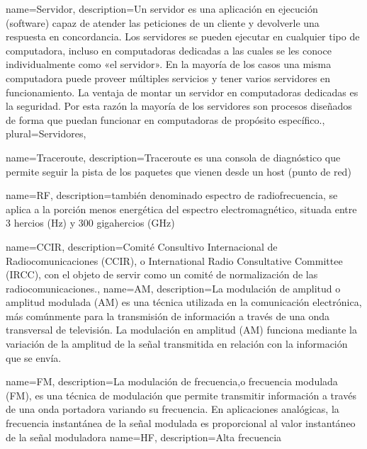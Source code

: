
{
name=Servidor,
description={Un servidor es una aplicación en ejecución (software) capaz de atender las peticiones de un cliente y devolverle una respuesta en concordancia. Los servidores se pueden ejecutar en cualquier tipo de computadora, incluso en computadoras dedicadas a las cuales se les conoce individualmente como «el servidor». En la mayoría de los casos una misma computadora puede proveer múltiples servicios y tener varios servidores en funcionamiento. La ventaja de montar un servidor en computadoras dedicadas es la seguridad. Por esta razón la mayoría de los servidores son procesos diseñados de forma que puedan funcionar en computadoras de propósito específico.},
plural={Servidores},
}

{
name=Traceroute,
description={Traceroute es una consola de diagnóstico que permite seguir la pista de los paquetes que vienen desde un host (punto de red)}
}

{
name=RF,
description={también denominado espectro de radiofrecuencia, se aplica a la porción menos energética del espectro electromagnético, situada entre 3 hercios (Hz) y 300 gigahercios (GHz)}
}





{
  name=CCIR,
  description={Comité Consultivo Internacional de Radiocomunicaciones (CCIR), o International Radio Consultative Committee (IRCC), con el objeto de servir como un comité de normalización de las radiocomunicaciones.},
}
{
name=AM,
description={La modulación de amplitud o amplitud modulada (AM) es una técnica utilizada en la comunicación electrónica, más comúnmente para la transmisión de información a través de una onda transversal de televisión. La modulación en amplitud (AM) funciona mediante la variación de la amplitud de la señal transmitida en relación con la información que se envía.}
}


{
name=FM,
description={La modulación de frecuencia,o frecuencia modulada (FM), es una técnica de modulación que permite transmitir información a través de una onda portadora variando su frecuencia. En aplicaciones analógicas, la frecuencia instantánea de la señal modulada es proporcional al valor instantáneo de la señal moduladora}
}
{
name=HF,
description={Alta frecuencia}
}


